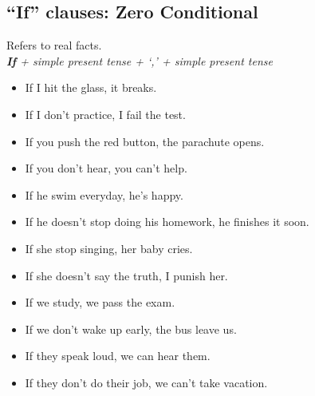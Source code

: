 \subsection{``If'' clauses: Zero Conditional}
\begin{multicols}{2}
Refers to real facts.\\
\emph{\textbf{If} + simple present tense + `,' + simple present tense}
\begin{itemize}
\item If I hit the glass, it breaks.
\item If I don't practice, I fail the test.
\item If you push the red button, the parachute opens.
\item If you don't hear, you can't help.
\item If he swim everyday, he's happy.
\item If he doesn't stop doing his homework, he finishes it soon.
\item If she stop singing, her baby cries.
\item If she doesn't say the truth, I punish her.
\item If we study, we pass the exam.
\item If we don't wake up early, the bus leave us.
\item If they speak loud, we can hear them.
\item If they don't do their job, we can't take vacation.
\end{itemize}
\end{multicols}

